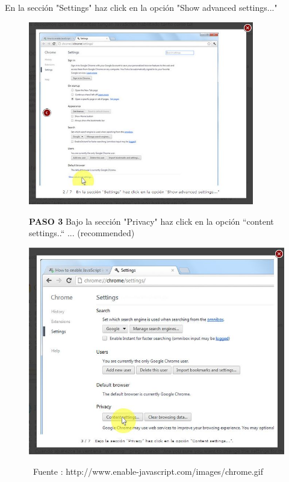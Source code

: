 \documentclass[11pt]{article} %
\begin{document}
En la sección "Settings" haz click en la 
opción "Show advanced settings..."
\begin{figure}
\begin{center}
\begin{center}
\end{center}
\includegraphics[height=8cm, width=8 cm] {imagenes/chrome 02.JPG}




\begin{center}
\textbf{ PASO 3}
Bajo la sección "Privacy" haz click en la opción 
``content settings..`` ... (recommended)
\newline

\includegraphics[height=8 cm, width=8 cm] {imagenes/chrome 03.JPG}
\end{center}
\ Fuente :{ http://www.enable-javascript.com/images/chrome.gif }
\newline


\end{center}
\end{figure}
\end{document}
